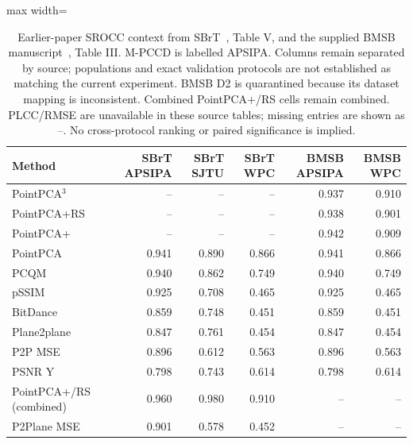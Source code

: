\begin{table}[t!]
\centering
\caption{Earlier-paper SROCC context from SBrT~\cite{carvalho2025rs}, Table V, and the supplied BMSB manuscript~\cite{carvalho2026pc3}, Table III. M-PCCD is labelled APSIPA. Columns remain separated by source; populations and exact validation protocols are not established as matching the current experiment. BMSB D2 is quarantined because its dataset mapping is inconsistent. Combined PointPCA+/RS cells remain combined. PLCC/RMSE are unavailable in these source tables; missing entries are shown as --. No cross-protocol ranking or paired significance is implied.}
\label{tab_review_sota}
\scriptsize
\begin{adjustbox}{max width=\textwidth}
\begin{tabular}{lrrrrr}
\toprule
Method & SBrT APSIPA & SBrT SJTU & SBrT WPC & BMSB APSIPA & BMSB WPC \\
\midrule
PointPCA$^3$ & -- & -- & -- & 0.937 & 0.910 \\
PointPCA+RS & -- & -- & -- & 0.938 & 0.901 \\
PointPCA+ & -- & -- & -- & 0.942 & 0.909 \\
PointPCA & 0.941 & 0.890 & 0.866 & 0.941 & 0.866 \\
PCQM & 0.940 & 0.862 & 0.749 & 0.940 & 0.749 \\
pSSIM & 0.925 & 0.708 & 0.465 & 0.925 & 0.465 \\
BitDance & 0.859 & 0.748 & 0.451 & 0.859 & 0.451 \\
Plane2plane & 0.847 & 0.761 & 0.454 & 0.847 & 0.454 \\
P2P MSE & 0.896 & 0.612 & 0.563 & 0.896 & 0.563 \\
PSNR Y & 0.798 & 0.743 & 0.614 & 0.798 & 0.614 \\
PointPCA+/RS (combined) & 0.960 & 0.980 & 0.910 & -- & -- \\
P2Plane MSE & 0.901 & 0.578 & 0.452 & -- & -- \\
\bottomrule
\end{tabular}
\end{adjustbox}
\end{table}
